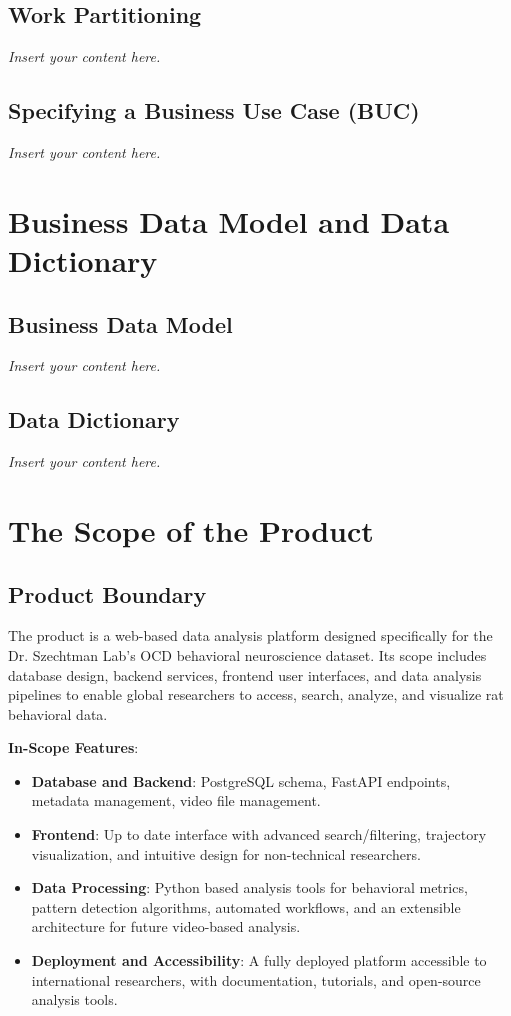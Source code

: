 \documentclass[12pt]{article}
\newcommand{\lips}{\textit{Insert your content here.}}
\begin{document}
\subsection{Work Partitioning}
\lips
\subsection{Specifying a Business Use Case (BUC)}
\lips

\section{Business Data Model and Data Dictionary}
\subsection{Business Data Model}
\lips
\subsection{Data Dictionary}
\lips

\section{The Scope of the Product}

\subsection{Product Boundary}
The product is a web-based data analysis platform designed specifically for the Dr. Szechtman Lab’s OCD behavioral neuroscience dataset. Its scope includes database design, backend services, frontend user interfaces, and data analysis pipelines to enable global researchers to access, search, analyze, and visualize rat behavioral data.

\textbf{In-Scope Features}:
\begin{itemize}
    \item \textbf{Database and Backend}: PostgreSQL schema, FastAPI endpoints, metadata management, video file management.
    \item \textbf{Frontend}: Up to date interface with advanced search/filtering, trajectory visualization, and intuitive design for non-technical researchers.
    \item \textbf{Data Processing}: Python based analysis tools for behavioral metrics, pattern detection algorithms, automated workflows, and an extensible architecture for future video-based analysis.
    \item \textbf{Deployment and Accessibility}: A fully deployed platform accessible to international researchers, with documentation, tutorials, and open-source analysis tools.
\end{itemize}
\end{document}
